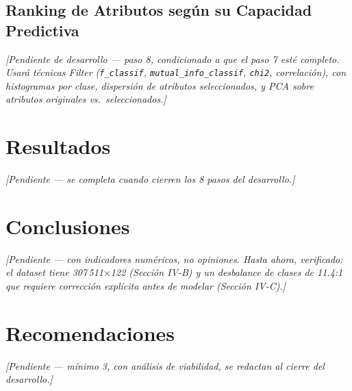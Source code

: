 \documentclass[conference]{IEEEtran}
\begin{document}
\subsection{Ranking de Atributos según su Capacidad Predictiva}
\textit{[Pendiente de desarrollo --- paso 8, condicionado a que el paso 7
esté completo. Usará técnicas \emph{Filter} (\texttt{f\_classif},
\texttt{mutual\_info\_classif}, \texttt{chi2}, correlación), con
histogramas por clase, dispersión de atributos seleccionados, y PCA sobre
atributos originales vs.\ seleccionados.]}

\section{Resultados}
\textit{[Pendiente --- se completa cuando cierren los 8 pasos del
desarrollo.]}

\section{Conclusiones}
\textit{[Pendiente --- con indicadores numéricos, no opiniones. Hasta
ahora, verificado: el dataset tiene 307\,511$\times$122 (Sección IV-B) y
un desbalance de clases de 11.4:1 que requiere corrección explícita antes
de modelar (Sección IV-C).]}

\section{Recomendaciones}
\textit{[Pendiente --- mínimo 3, con análisis de viabilidad, se redactan
al cierre del desarrollo.]}

\end{document}
